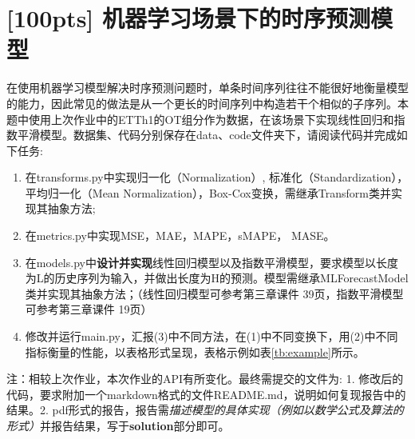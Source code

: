 \documentclass[a4paper,UTF8]{article}
\numberwithin{equation}{section}
\begin{document}
\section{[100pts] 机器学习场景下的时序预测模型}
在使用机器学习模型解决时序预测问题时，单条时间序列往往不能很好地衡量模型的能力，因此常见的做法是从一个更长的时间序列中构造若干个相似的子序列。本题中使用上次作业中的ETTh1的OT组分作为数据，在该场景下实现线性回归和指数平滑模型。数据集、代码分别保存在data、code文件夹下，请阅读代码并完成如下任务:
\begin{enumerate}[ {(}1{)}]
\item 在transforms.py中实现归一化（Normalization）, 标准化（Standardization），平均归一化（Mean Normalization），Box-Cox变换，需继承Transform类并实现其抽象方法;

\item 在metrics.py中实现MSE，MAE，MAPE，sMAPE，	MASE。
\item 在models.py中\textbf{设计并实现}线性回归模型以及指数平滑模型，要求模型以长度为L的历史序列为输入，并做出长度为H的预测。模型需继承MLForecastModel类并实现其抽象方法；（线性回归模型可参考第三章课件 39页，指数平滑模型可参考第三章课件 19页）

\item 修改并运行main.py，汇报(3)中不同方法，在(1)中不同变换下，用(2)中不同指标衡量的性能，以表格形式呈现，表格示例如表\ref{tb:example}所示。
\end{enumerate}
注：相较上次作业，本次作业的API有所变化。最终需提交的文件为: 1. 修改后的代码，要求附加一个markdown格式的文件README.md，说明如何复现报告中的结果。2. pdf形式的报告，报告需\textit{描述模型的具体实现（例如以数学公式及算法的形式）}并报告结果，写于\textbf{solution}部分即可。
\end{document}
